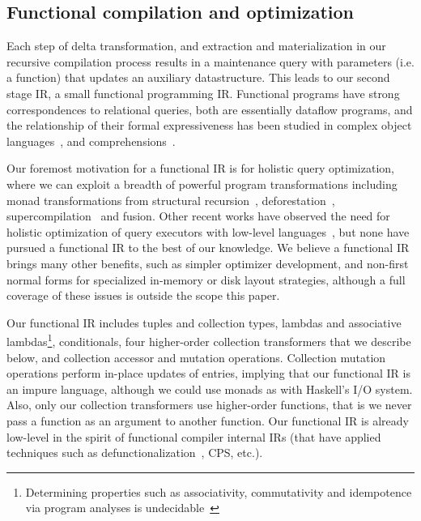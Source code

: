 \subsection{Functional compilation and optimization}
\label{sec:kthree}



\def\map{\mbox{\texttt{map}}}
\def\flatten{\mbox{\texttt{flatten}}}
\def\agg{\mbox{\texttt{agg}}}
\def\groupagg{\mbox{\texttt{groupagg}}}
\def\apply{\mbox{\texttt{apply}}}



Each step of delta transformation, and extraction and materialization in our
recursive compilation process results in a maintenance query with parameters
(i.e. a function) that updates an auxiliary datastructure. This leads to our
second stage IR, a small functional programming IR.
Functional programs have strong correspondences to relational queries, both are
essentially dataflow programs, and the relationship of their formal
expressiveness has been studied in complex object
languages~\cite{buneman-kleisli:95}, and comprehensions~\cite{jones-haskell:07}.

Our foremost motivation for a functional IR is for holistic query optimization,
where we can exploit a breadth of powerful program transformations including
monad transformations from structural recursion~\cite{buneman-kleisli:95},
deforestation~\cite{marlow-fp:92}, supercompilation~\cite{jonsson-popl:09} and
fusion.
Other recent works have observed the need for holistic optimization of query
executors with low-level languages~\cite{krikellas-icde:10,neumann-pvldb:11},
but none have pursued a functional IR to the best of our knowledge.
We believe a functional IR brings many other benefits, such as simpler optimizer
development, and non-first normal forms for specialized in-memory or disk layout
strategies, although a full coverage of these issues is outside the scope this
paper.


Our functional IR includes tuples and collection types, lambdas and associative
lambdas\footnote{Determining properties such as associativity, commutativity and
idempotence via program analyses is undecidable~\cite{buneman-kleisli:95}},
conditionals, four higher-order collection transformers that we describe below,
and collection accessor and mutation operations. Collection mutation operations
perform in-place updates of entries, implying that our functional IR is an
impure language, although we could use monads as with Haskell's I/O system.
Also, only our collection transformers use  higher-order functions, that is we
never pass a function as an argument to another function. Our functional IR is
already low-level in the spirit of functional compiler internal IRs (that have
applied techniques such as defunctionalization~\cite{danvy-ppdp:01}, CPS, etc.).



